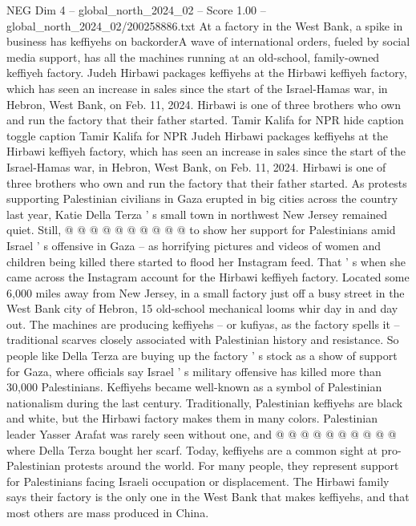 \begin{textsample}{NEG Dim 4 – global\_north\_2024\_02 – Score 1.00 – global\_north\_2024\_02/200258886.txt}  \label{ex:f4_neg_273}
At a factory in the West Bank, a spike in business has keffiyehs on backorderA wave of international orders, fueled by social media support, has all the machines running at an old-school, family-owned keffiyeh factory.
Judeh Hirbawi packages keffiyehs at the Hirbawi keffiyeh factory, which has seen an increase in sales since the start of the Israel-Hamas war, in Hebron, West Bank, on Feb. 11, 2024.
Hirbawi is one of three brothers who own and run the factory that their father started.
Tamir Kalifa for NPR hide caption toggle caption Tamir Kalifa for NPR Judeh Hirbawi packages keffiyehs at the Hirbawi keffiyeh factory, which has seen an increase in sales since the start of the Israel-Hamas war, in Hebron, West Bank, on Feb. 11, 2024.
Hirbawi is one of three brothers who own and run the factory that their father started.
As protests supporting Palestinian civilians in Gaza erupted in big cities across the country last year, Katie Della Terza ' s small town in northwest New Jersey remained quiet.
Still, @ @ @ @ @ @ @ @ @ @ to show her support for Palestinians amid Israel ' s offensive in Gaza -- as horrifying pictures and videos of women and children being killed there started to flood her Instagram feed.
That ' s when she came across the Instagram account for the Hirbawi keffiyeh factory.
Located some 6,000 miles away from New Jersey, in a small factory just off a busy street in the West Bank city of Hebron, 15 old-school mechanical looms whir day in and day out.
The machines are producing keffiyehs -- or kufiyas, as the factory spells it -- traditional scarves closely associated with Palestinian history and resistance.
So people like Della Terza are buying up the factory ' s stock as a show of support for Gaza, where officials say Israel ' s military offensive has killed more than 30,000 Palestinians.
Keffiyehs became well-known as a symbol of Palestinian nationalism during the last century.
Traditionally, Palestinian keffiyehs are black and white, but the Hirbawi factory makes them in many colors.
Palestinian leader Yasser Arafat was rarely seen without one, and @ @ @ @ @ @ @ @ @ @ where Della Terza bought her scarf.
Today, keffiyehs are a common sight at pro-Palestinian protests around the world.
For many people, they represent support for Palestinians facing Israeli occupation or displacement.
The Hirbawi family says their factory is the only one in the West Bank that makes keffiyehs, and that most others are mass produced in China.

\end{textsample}
